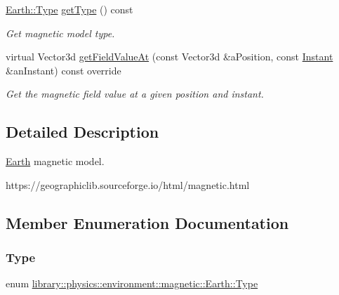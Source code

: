 \begin{DoxyCompactItemize}
\hyperlink{classlibrary_1_1physics_1_1environment_1_1magnetic_1_1_earth_ab9d257d23aa5899a3ef36c7dec62ef72}{Earth\+::\+Type} \hyperlink{classlibrary_1_1physics_1_1environment_1_1magnetic_1_1_earth_a0df623ebad4942ff9e3ab1ed7387e275}{get\+Type} () const
\begin{DoxyCompactList}\small\item\em Get magnetic model type. \end{DoxyCompactList}\item 
virtual Vector3d \hyperlink{classlibrary_1_1physics_1_1environment_1_1magnetic_1_1_earth_adc06e5eaa4df94dcad0709cc3abfa20d}{get\+Field\+Value\+At} (const Vector3d \&a\+Position, const \hyperlink{classlibrary_1_1physics_1_1time_1_1_instant}{Instant} \&an\+Instant) const override
\begin{DoxyCompactList}\small\item\em Get the magnetic field value at a given position and instant. \end{DoxyCompactList}\end{DoxyCompactItemize}


\subsection{Detailed Description}
\hyperlink{classlibrary_1_1physics_1_1environment_1_1magnetic_1_1_earth}{Earth} magnetic model. 

https\+://geographiclib.sourceforge.\+io/html/magnetic.html 

\subsection{Member Enumeration Documentation}
\mbox{\label{classlibrary_1_1physics_1_1environment_1_1magnetic_1_1_earth_ab9d257d23aa5899a3ef36c7dec62ef72}} 
\subsubsection{\texorpdfstring{Type}{Type}}
{\footnotesize\ttfamily enum \hyperlink{classlibrary_1_1physics_1_1environment_1_1magnetic_1_1_earth_ab9d257d23aa5899a3ef36c7dec62ef72}{library\+::physics\+::environment\+::magnetic\+::\+Earth\+::\+Type}\hspace{0.3cm}{\ttfamily [strong]}}

